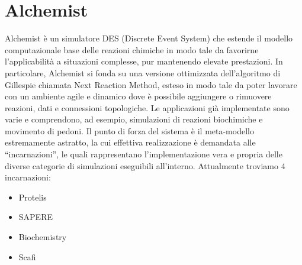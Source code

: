 \section{Alchemist}
Alchemist\space\cite{Pianini_2013} è un simulatore DES (Discrete Event System) che estende il modello computazionale 
base delle reazioni chimiche in modo tale da favorirne l'applicabilità a situazioni complesse,
pur mantenendo elevate prestazioni. In particolare, Alchemist si fonda su una versione ottimizzata 
dell'algoritmo di Gillespie\cite{gillespie1977exact} chiamata Next Reaction Method\cite{gibson2000efficient}, esteso in modo tale da poter lavorare 
con un ambiente agile e dinamico dove è possibile aggiungere o rimuovere reazioni, dati e
connessioni topologiche. Le applicazioni già implementate sono varie e comprendono, ad esempio, 
simulazioni di reazioni biochimiche e movimento di pedoni. Il punto di forza del sistema è il 
meta-modello estremamente astratto, la cui effettiva realizzazione è demandata alle ``incarnazioni'',
le quali rappresentano l'implementazione vera e propria delle diverse categorie di simulazioni 
eseguibili all'interno. Attualmente troviamo 4 incarnazioni: 
\begin{itemize}
    \item Protelis
    \item SAPERE
    \item Biochemistry
    \item Scafi
\end{itemize}
